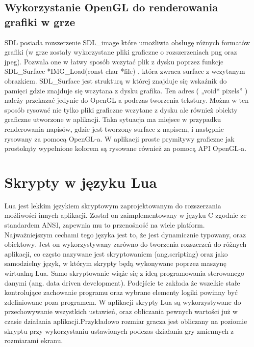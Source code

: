 \subsection{Wykorzystanie OpenGL do renderowania grafiki w grze}
SDL posiada rozszerzenie SDL\_image które umożliwia obsługę różnych formatów grafiki (w grze zostały wykorzystane pliki graficzne o rozszerzeniach png oraz jpeg). Pozwala one w łatwy sposób wczytać plik z dysku poprzez funkcje SDL\_Surface *IMG\_Load(const char *file) , która zwraca surface z
wczytanym obrazkiem. SDL\_Surface jest strukturą w której znajduje się wskaźnik do pamięci gdzie znajduje się wczytana z dysku grafika. Ten adres (
„void* pixels” ) należy przekazać jedynie do OpenGL-a podczas tworzenia tekstury.
Można w ten sposób rysować nie tylko pliki graficzne wczytane z dysku ale również obiekty graficzne utworzone w aplikacji. Taka sytuacja ma miejsce w
przypadku renderowania napisów, gdzie jest tworzony surface z napisem, i następnie rysowany za pomocą OpenGL-a. W aplikacji proste prymitywy graficzne
jak prostokąty wypełnione kolorem są rysowane również za pomocą API OpenGL-a.


\section{Skrypty w języku Lua}
\hspace{1cm} Lua jest lekkim językiem skryptowym zaprojektowanym do rozszerzania możliwości innych aplikacji. Został on zaimplementowany w języku C zgodnie ze standardem ANSI, zapewnia mu to przenośność na wiele platform. Najważniejszym cechami tego języka jest to, że jest dynamicznie typowany, oraz obiektowy. Jest on wykorzystywany zarówno do tworzenia rozszerzeń do różnych aplikacji, co często nazywane jest skryptowaniem (ang.scripting) oraz jako samodzielny język, w którym skrypty będą wykonywane poprzez maszynę wirtualną Lua. Samo skryptowanie wiąże się z ideą programowania sterowanego danymi (ang. data driven development).
Podejście te zakłada że wszelkie stałe kontrolujące zachowanie programu oraz wybrane elementy logiki powinny być zdefiniowane poza programem. W aplikacji skrypty Lua są wykorzystywane do przechowywanie wszystkich ustawień, oraz obliczania pewnych wartości 
już w czasie działania aplikacji.Przykładowo rozmiar gracza jest obliczany na poziomie skryptu przy wykorzystaniu ustawionych podczas działania gry zmiennych z rozmiarami ekranu. 

